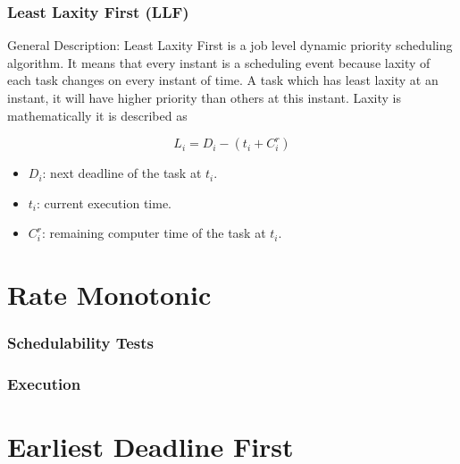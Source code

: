 \documentclass{beamer}
\begin{document}
\begin{frame}
\frametitle{Least Laxity First (\textbf{LLF})}

\begin{alertblock}{General Description:}
Least Laxity First  is a job level dynamic priority scheduling algorithm. It means that every instant is a scheduling event because laxity of each task changes on every instant of time. A task which has least laxity at an instant, it will have higher priority than others at this instant. Laxity is mathematically it is described as

\begin{equation}
    L_i = D_i - (t_i + C^r_i)
\end{equation}

\begin{itemize}
    \item $D_i$: next deadline of the task at $t_i$.
    \item $t_i$: current execution time.
    \item $C^r_i$: remaining computer time of the task at $t_i$.
\end{itemize}
\end{alertblock}

\end{frame}

\section{Rate Monotonic}

\begin{frame}
\frametitle{Schedulability Tests}

\end{frame}

\begin{frame}
\frametitle{Execution}

\end{frame}

\section{Earliest Deadline First}
\end{document}
